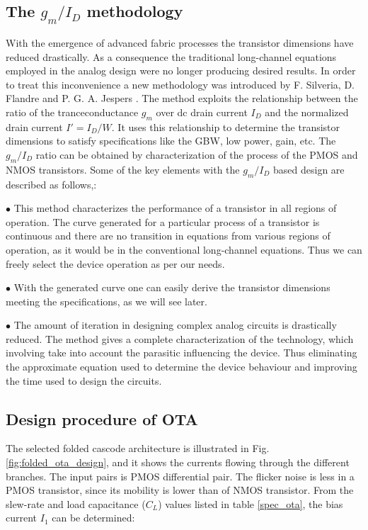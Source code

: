 \subsection{The $g_m/I_D$ methodology}

With the emergence of advanced fabric processes the transistor dimensions have reduced drastically. As a consequence the traditional long-channel equations employed in the analog design were no longer producing desired results. In order to treat this inconvenience a new methodology was introduced by F. Silveria, D. Flandre and P. G. A. Jespers \cite{gm_id_1}. The method exploits the relationship between the ratio of the tranceconductance $g_m$ over dc drain current $I_D$ and the normalized drain current $I' = I_D/W$. It uses this relationship to determine the transistor dimensions to satisfy specifications like the GBW, low power, gain, etc. The $g_m/I_D$ ratio can be obtained by characterization of the process of the PMOS and NMOS transistors. Some of the key elements with the $g_m/I_D$  based design are described as follows\cite{gm_id_1},\cite{gm_id_2}:

$\bullet$ This method characterizes the performance of a transistor in all regions of operation. The curve generated for a particular process of a transistor is continuous and there are no transition in equations from various regions of operation, as it would be in the conventional long-channel equations. Thus we can freely select the device operation as per our needs. 

$\bullet$ With the generated curve one can easily derive the transistor dimensions meeting the specifications, as we will see later. 

$\bullet$ The amount of iteration in designing complex analog circuits is drastically reduced. The method gives a complete characterization of the technology, which involving take into account the parasitic influencing the device. Thus eliminating the approximate equation used to determine the device behaviour and improving the time used to design the circuits. 

\subsection{Design procedure of OTA}

The selected folded cascode architecture is illustrated in Fig. \ref{fig:folded_ota_design}, and it shows the currents flowing through the different branches. The input pairs is PMOS differential pair. The flicker noise is less in a PMOS transistor, since its mobility is lower than of NMOS transistor\cite{Johns}. From the slew-rate and load capacitance ($C_L$) values listed in table \ref{spec_ota}, the bias current $I_1$ can be determined:

